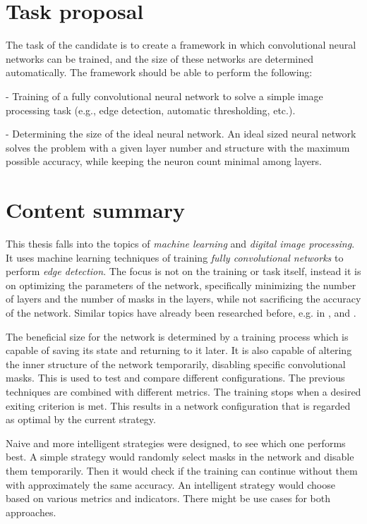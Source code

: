 \documentclass[12pt]{report}
\begin{document}
\chapter*{Task proposal}

The task of the candidate is to create a framework in which convolutional neural networks can be trained, and the size of these networks are determined automatically. The framework should be able to perform the following:

- Training of a fully convolutional neural network to solve a simple image processing task (e.g., edge detection, automatic thresholding, etc.).

- Determining the size of the ideal neural network. An ideal sized neural network solves the problem with a given layer number and structure with the maximum possible accuracy, while keeping the neuron count minimal among layers.

\chapter*{Content summary}

This thesis falls into the topics of \textit{machine learning} and \textit{digital image processing}. It uses machine learning techniques of training \textit{fully convolutional networks} to perform \textit{edge detection}. The focus is not on the training or task itself, instead it is on optimizing the parameters of the network, specifically minimizing the number of layers and the number of masks in the layers, while not sacrificing the accuracy of the network. Similar topics have already been researched before, e.g. in \cite{pruning_web}, \cite{pruning_arxiv} and \cite{understanding}.

The beneficial size for the network is determined by a training process which is capable of saving its state and returning to it later. It is also capable of altering the inner structure of the network temporarily, disabling specific convolutional masks. This is used to test and compare different configurations. The previous techniques are combined with different metrics. The training stops when a desired exiting criterion is met. This results in a network configuration that is regarded as optimal by the current strategy.

Naive and more intelligent strategies were designed, to see which one performs best. A simple strategy would randomly select masks in the network and disable them temporarily. Then it would check if the training can continue without them with approximately the same accuracy. An intelligent strategy would choose based on various metrics and indicators. There might be use cases for both approaches.
\end{document}
